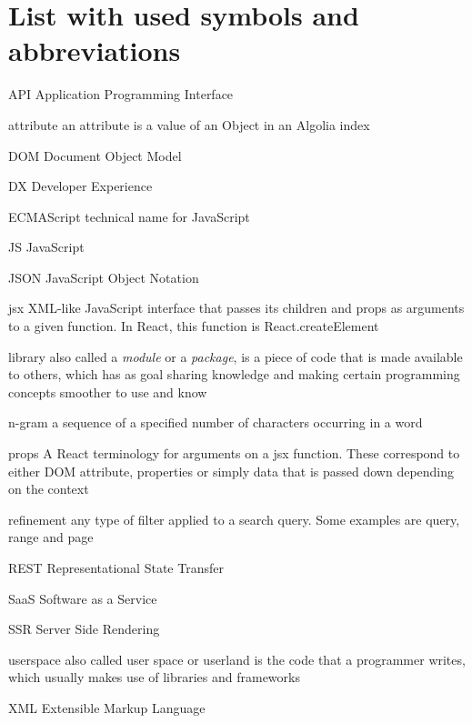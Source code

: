
\chapter{List with used symbols and abbreviations}

\begin{abbreviations}
\item[API] Application Programming Interface
\item[attribute] an attribute is a value of an Object in an Algolia index
\item[DOM] Document Object Model
\item[DX] Developer Experience
\item[ECMAScript] technical name for JavaScript
\item[JS] JavaScript
\item[JSON] JavaScript Object Notation
\item[jsx] XML-like JavaScript interface that passes its children and props as arguments to a given function. In React, this function is React.createElement
\item[library] also called a \emph{module} or a \emph{package}, is a piece of code that is made available to others, which has as goal sharing knowledge and making certain programming concepts smoother to use and know
\item[n-gram] a sequence of a specified number of characters occurring in a word\cite{kimbrell1988searching}
\item[props] A React terminology for arguments on a jsx function. These correspond to either DOM attribute, properties or simply data that is passed down depending on the context
\item[refinement] any type of filter applied to a search query. Some examples are query, range and page
\item[REST] Representational State Transfer\cite{fielding2000architectural}
\item[SaaS] Software as a Service
\item[SSR] Server Side Rendering
\item[userspace] also called user space or userland is the code that a programmer writes, which usually makes use of libraries and frameworks
\item[XML] Extensible Markup Language
\end{abbreviations}
